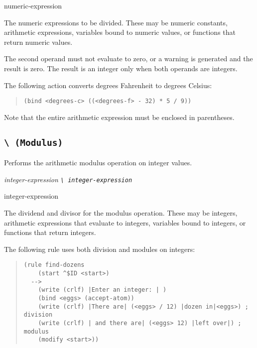 \begin{operands}
\item[numeric-expression]

  The numeric expressions to be divided. These may be numeric
  constants, arithmetic expressions, variables bound to numeric
  values, or functions that return numeric values.

  The second operand must not evaluate to zero, or a warning is
  generated and the result is zero. The result is an integer only when
  both operands are integers.
\end{operands}

\Example 

The following action converts degrees Fahrenheit to degrees Celsius:

\begin{quote}
\begin{verbatim}
(bind <degrees-c> ((<degrees-f> - 32) * 5 / 9))
\end{verbatim}
\end{quote}

Note that the entire arithmetic expression must be enclosed in
parentheses.

\subsection{\tt\textbackslash{} (Modulus)}

Performs the arithmetic modulus operation on integer values.

\Format

\it{integer-expression} \tt{\textbackslash} \it{integer-expression}

\begin{operands}
\item[integer-expression]

  The dividend and divisor for the modulus operation. These may be
  integers, arithmetic expressions that evaluate to integers,
  variables bound to integers, or functions that return integers.
\end{operands}

\Example

The following rule uses both division and modules on integers:

\begin{quote}
\begin{verbatim}
(rule find-dozens
    (start ^$ID <start>)
  -->
    (write (crlf) |Enter an integer: | )
    (bind <eggs> (accept-atom))
    (write (crlf) |There are| (<eggs> / 12) |dozen in|<eggs>) ; division
    (write (crlf) | and there are| (<eggs> 12) |left over|) ; modulus
    (modify <start>))
\end{verbatim}
\end{quote}

